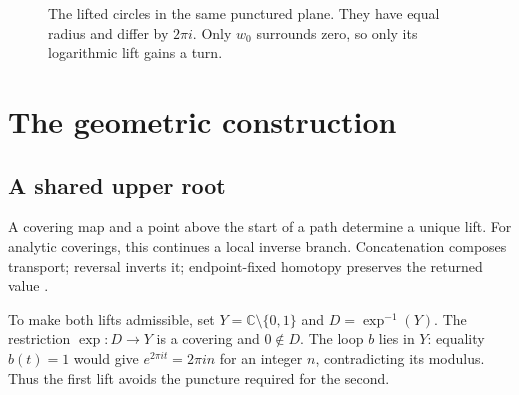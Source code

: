 \documentclass[11pt]{article}
\theoremstyle{definition}
\theoremstyle{plain}
\newcommand{\C}{\mathbb C}
\begin{document}
\begin{figure}[!ht]
\centering
{}
\caption{The lifted circles in the same punctured plane.
They have equal radius and differ by $2\pi i$.
Only $w_0$ surrounds zero, so only its logarithmic lift gains a turn.}
\label{fig:winding}
\end{figure}

\section{The geometric construction}\label{sec:construction}

\subsection*{A shared upper root}
A covering map and a point above the start of a path determine a unique
lift. For analytic coverings, this continues a local inverse branch.
Concatenation composes transport; reversal inverts it; endpoint-fixed
homotopy preserves the returned value \cite[\S1.3]{hatcher}.

To make both lifts admissible, set
$Y=\C\setminus\{0,1\}$ and $D=\exp^{-1}(Y)$.
The restriction $\exp:D\to Y$ is a covering and $0\notin D$.
The loop $b$ lies in $Y$: equality $b(t)=1$ would give
$e^{2\pi it}=2\pi in$ for an integer $n$, contradicting its modulus.
Thus the first lift avoids the puncture required for the second.
\end{document}
